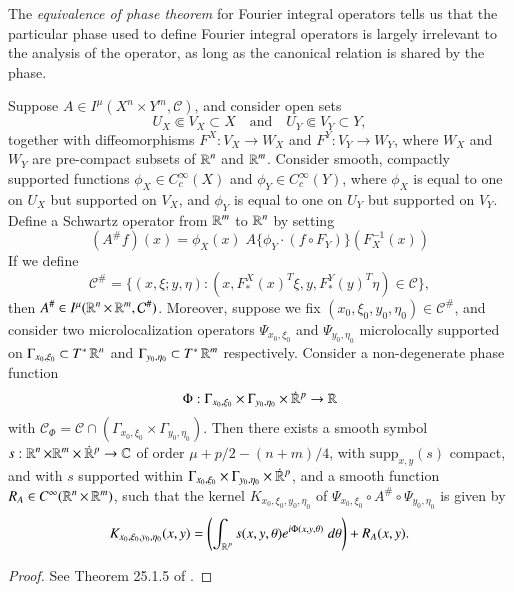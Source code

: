 The \emph{equivalence of phase theorem} for Fourier integral operators tells us that the particular phase used to define Fourier integral operators is largely irrelevant to the analysis of the operator, as long as the canonical relation is shared by the phase.

\begin{theorem} \label{thm:equivalenceofphase}
  Suppose $A \in I^\mu(X^n \times Y^m, \mathcal{C})$, and consider open sets
  \[ U_X \Subset V_X \subset X \quad\text{and}\quad U_Y \Subset V_Y \subset Y, \]
  together with diffeomorphisms $F^X: V_X \to W_X$ and $F^Y: V_Y \to W_Y$, where $W_X$ and $W_Y$ are pre-compact subsets of $\operatorname{\mathbb{R}}^n$ and $\operatorname{\mathbb{R}}^m$. Consider smooth, compactly supported functions $\phi_X \in C_c^\infty(X)$ and $\phi_Y \in C_c^\infty(Y)$, where $\phi_X$ is equal to one on $U_X$ but supported on $V_X$, and $\phi_Y$ is equal to one on $U_Y$ but supported on $V_Y$. Define a Schwartz operator from $\operatorname{\mathbb{R}}^m$ to $\operatorname{\mathbb{R}}^n$ by setting
  \[ (A^\#\! f)(x) = \phi_X(x)\; A \{ \phi_Y \cdot (f \circ F_Y) \} ( F_X^{-1}(x) ) \]
  If we define
  \[ \mathcal{C}^\# = \{ (x,\xi;y,\eta) : (x, F^X_{\!*}(x)^T \xi, y, F^Y_*(y)^T \eta) \in \mathcal{C} \}, \]
  then $A^\# \in I^\mu(\operatorname{\mathbb{R}}^n \times \operatorname{\mathbb{R}}^m, \mathcal{C}^\#)$. Moreover, suppose we fix $(x_0,\xi_0,y_0,\eta_0) \in \mathcal{C}^\#$, and consider two microlocalization operators $\Psi_{x_0,\xi_0}$ and $\Psi_{y_0,\eta_0}$ microlocally supported on $\Gamma_{x_0,\xi_0} \subset T^* \operatorname{\mathbb{R}}^n$ and $\Gamma_{y_0,\eta_0} \subset T^* \operatorname{\mathbb{R}}^m$ respectively. Consider a non-degenerate phase function
  \[ \Phi: \Gamma_{x_0,\xi_0} \times {\Gamma_{y_0,\eta_0}} \times {\dot{\RR}{\vphantom{\RR}}^p} \to \RR \]
  with $\mathcal{C}_\Phi = \mathcal{C} \cap (\Gamma_{x_0,\xi_0} \times \Gamma_{y_0,\eta_0})$. Then there exists a smooth symbol $s: \RR^n \times {\RR^m} \times {\dot{\RR}{\vphantom{\RR}}^p} \to \CC$ of order $\mu + p/2 - (n+m)/4$, with $\text{supp}_{x,y}(s)$ compact, and with $s$ supported within $\Gamma_{x_0,\xi_0} \times \Gamma_{y_0,\eta_0} \times {\dot{\RR}{\vphantom{\RR}}^p}$, and a smooth function $R_A \in C^\infty(\operatorname{\mathbb{R}}^n \times \operatorname{\mathbb{R}}^m)$, such that the kernel $K_{x_0,\xi_0,y_0,\eta_0}$ of $\Psi_{x_0,\xi_0} \circ A^\# \circ \Psi_{y_0,\eta_0}$ is given by
  \[ K_{x_0,\xi_0,y_0,\eta_0}(x,y) = \left( \int_{\operatorname{\mathbb{R}}^p} s(x,y,\theta) e^{i \Phi(x,y,\theta)}\; d\theta \right) + R_A(x,y). \]
\end{theorem}
\begin{proof}
  See Theorem 25.1.5 of \cite{Hormander4}.
\end{proof}

